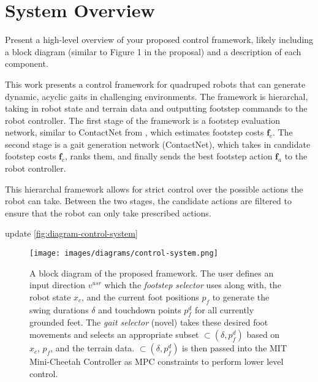\section{System Overview}

\begin{outline}
  Present a high-level overview of your proposed control framework,
  likely including a block diagram (similar to Figure 1 in the
  proposal) and a description of each component.
\end{outline}

This work presents a control framework for quadruped robots that
can generate dynamic, acyclic gaits in challenging environments. The
framework is hierarchal, taking in robot state and terrain data and
outputting footstep commands to the robot controller. The first stage of
the framework is a footstep evaluation network, similar to ContactNet
from \cite{bratta_contactnet_2024}, which estimates footstep costs
$\mathbf f_c$.
The second stage is a gait generation
network (ContactNet), which takes in candidate footstep costs $\mathbf f_c$,
ranks them, and finally sends the best footstep action $\mathbf f_a$ to the
robot controller.

This hierarchal framework allows for strict control over the possible
actions the robot can take. Between the two stages, the candidate
actions are filtered to ensure that the robot can only take prescribed
actions.

\begin{todo}
  update \autoref{fig:diagram-control-system}
\end{todo}

\begin{figure}[H]
  \centering
  \texttt{[image: images/diagrams/control-system.png]}
  \caption{A block diagram of the proposed framework. The user
    defines an input direction $v^{usr}$ which the \textit{footstep
    selector} \cite{bratta_contactnet_2024} uses along with, the robot
    state $x_c$, and the current foot positions $p_f$ to generate the
    swing durations $\delta$ and touchdown points $p_f^d$ for all
    currently grounded feet. The \textit{gait selector} (novel) takes
    these desired foot movements and selects an appropriate subset
    $\subset(\delta,p_f^d)$ based on $x_c$, $p_f$, and the terrain
    data. $\subset(\delta,p_f^d)$ is then passed into the MIT
  Mini-Cheetah Controller as MPC constraints to perform lower level control.}
  \label{fig:diagram-control-system}
\end{figure}
